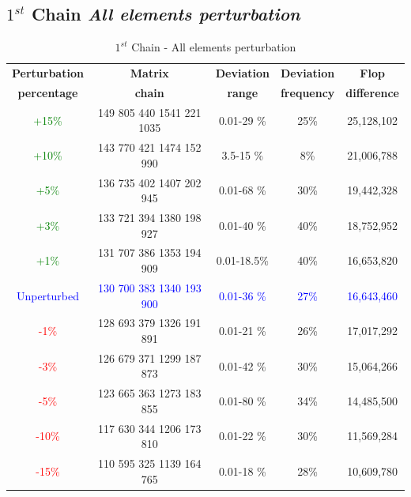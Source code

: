 \documentclass[10pts]{article}
\begin{document}
\subsection*{$1^{st}$ Chain \hspace{10pt} \textit{All elements perturbation}}
     	\begin{table}[h!]
     		\centering
     		
     			\begin{tabular}{|c| c | c |c | c |}
     				\hline
     				\textbf{Perturbation} &\textbf{Matrix} & \textbf{Deviation} & \textbf{Deviation} & \textbf{Flop }\\
     				\textbf{percentage}&\textbf{chain}& \textbf{range}&\textbf{frequency}&\textbf{difference}\\
     				\hline
     					\textcolor{green}{+15\%}&149 805 440 1541 221 1035	&	 0.01-29 \%		&	25\%		&	25,128,102\\
     				\textcolor{green}{+10\%}&143 770 421 1474 152 990	&	 3.5-15 \%		&	8\%			&   21,006,788\\
     				\textcolor{green}{+5\%}&136 735 402 1407 202 945	&    0.01-68 \%		&	30\%		&	19,442,328\\
     			\textcolor{green}{+3\%}	&133 721 394 1380 198 927	&    0.01-40 \%		&	40\%		&	18,752,952\\
     			\textcolor{green}{+1\%}	&131 707 386 1353 194 909	&    0.01-18.5\%	&	40\%	    &	16,653,820\\
     			\textcolor{blue}{Unperturbed}	&\textcolor{blue}{130} \textcolor{blue}{700} \textcolor{blue}{383} \textcolor{blue}{1340} \textcolor{blue}{193} \textcolor{blue}{900}	&    \textcolor{blue}{0.01-36 \%}		&	\textcolor{blue}{27\%}		&	\textcolor{blue}{16,643,460}\\
     			\textcolor{red}{-1\%}	&128 693 379 1326 191 891	&    0.01-21 \%		&	26\%		&	17,017,292\\
     			\textcolor{red}{-3\%}	&126 679 371 1299 187 873	&    0.01-42 \%		&	30\%		&	15,064,266\\
     			\textcolor{red}{-5\%}	&123 665 363 1273 183 855	&    0.01-80 \%		&	34\%		&	14,485,500\\
     			\textcolor{red}{-10\%}	&117 630 344 1206 173 810	& 	 0.01-22 \%		&	30\%		&	11,569,284\\
     			\textcolor{red}{-15\%}	&110 595 325 1139 164 765	&	 0.01-18 \%		&	28\%		&	10,609,780\\
     				\hline	
     			\end{tabular}
     	
     		\caption{$1^{st}$ Chain - All elements perturbation}
     		\label{table:$1^{st}$ Chain - All elements perturbation}
     	\end{table}
   
\end{document}
